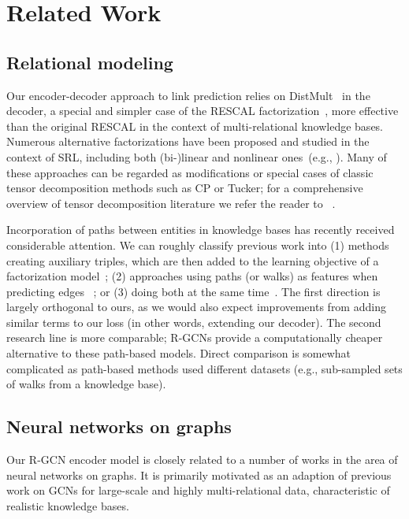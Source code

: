 \documentclass[letterpaper]{article} \usepackage{aaai18}  \usepackage{times}  \usepackage{helvet}  \usepackage{courier}  \usepackage{url}  \usepackage{graphicx}  \frenchspacing
\newcommand{\citet}[1]{\citeauthor{#1}~\shortcite{#1}}
\begin{document}
\section{Related Work}
\subsection{Relational modeling}
Our encoder-decoder approach to link prediction relies on DistMult~\cite{distmult-embedding_entities_and_relations} in the decoder,  a special and simpler case of the RESCAL factorization~\cite{nickel2011three}, more effective than the original RESCAL in the context of multi-relational knowledge bases. Numerous alternative factorizations have been proposed and studied in the context of SRL, including both (bi-)linear and nonlinear ones~(e.g., \cite{bordes2013translating,socher2013reasoning,KaiWei14,nickel2015holographic,complex-complex_embeddings_for_simple_link_prediction}). Many of these approaches can be regarded as modifications or special cases of classic tensor decomposition methods such as CP or Tucker; for a comprehensive overview of tensor decomposition literature we refer the reader to \citet{kolda2009tensor}.

Incorporation of paths between entities in knowledge
bases has recently received considerable attention. We can roughly classify previous work into (1) methods creating auxiliary triples, which are then added to the learning objective of a factorization model~\cite{guu2015traversing,garcia2015composing}; (2) approaches using paths (or walks) as features when predicting edges ~\cite{lin2015modeling}; or (3) doing both at the same time~\cite{neelakantan2015compositional,toutanova2016compositional}. The first direction is largely orthogonal to ours, as we would also expect improvements from adding similar terms to our loss (in other words, extending our decoder). The second research line is more comparable; R-GCNs provide a computationally cheaper alternative to these path-based models. Direct comparison is somewhat complicated as path-based methods used different datasets (e.g., sub-sampled sets of walks from a knowledge base).

\subsection{Neural networks on graphs}
Our R-GCN encoder model is closely related to a number of works in the area of neural networks on graphs. It is primarily motivated as an adaption of previous work on GCNs \cite{bruna2014spectral,duvenaud2015convolutional,defferrard2016convolutional,kipf2016semi} for large-scale and highly multi-relational data, characteristic of realistic knowledge bases.
\end{document}

